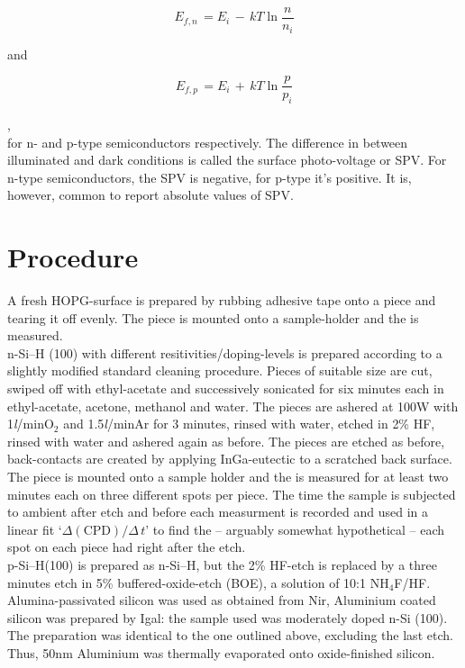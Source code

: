 \documentclass[a4paper,10pt]{article}
\newcommand{\sih}{Si--H}
\newcommand{\cpd}{\text{CPD}}
\newcommand{\hopg}{HOPG}
\newcommand{\spv}{SPV}
\newcommand{\litmin}{\emph{l}/min}
\begin{document}
\begin{minipage}[c]{0.4\textwidth}
	\begin{equation}
	E_{f,n} \, =  E_i \, - \, kT \ln{\frac{n}{n_i}}
	\end{equation}
\end{minipage}	
\hfill
and
\hfill
\begin{minipage}[c]{0.4\textwidth}
	\begin{equation}
	E_{f,p} \, = E_i \, + \, kT \ln{\frac{p}{p_i}}
	\end{equation}
\end{minipage},\\
for n- and p-type semiconductors respectively. The difference in \cpd{} between illuminated and dark conditions is called the surface photo-voltage or \spv{}. For n-type semiconductors, the \spv{} is negative, for p-type it\rq{}s positive. It is, however, common to report absolute values of \spv{}. 


\section{Procedure}
A fresh \hopg{}-surface is prepared by rubbing adhesive tape onto a piece and tearing it off evenly. The piece is mounted onto a sample-holder and the \cpd{} is measured.\\
n-\sih{} (100) with different resitivities/doping-levels is prepared according to a slightly modified standard cleaning procedure. Pieces of suitable size are cut, swiped off with ethyl-acetate and successively sonicated for six minutes each in ethyl-acetate, acetone, methanol and water. The pieces are ashered at 100W with 1\litmin O$_2$ and 1.5\litmin Ar for 3 minutes, rinsed with water, etched in 2\% HF, rinsed with water and ashered again as before. The pieces are etched as before, back-contacts are created by applying InGa-eutectic to a scratched back surface. The piece is mounted onto a sample holder and the \cpd{} is measured for at least two minutes each on three different spots per piece. The time the sample is subjected to ambient after etch and before each measurment is recorded and used in a linear fit \lq{}$\Delta (\cpd{})/\Delta \, t$\rq{} to find the -- arguably somewhat hypothetical -- \cpd{} each spot on each piece had right after the etch.\\
p-\sih{}(100) is prepared as n-\sih{}, but the 2\% HF-etch is replaced by a three minutes etch in 5\% buffered-oxide-etch (BOE), a solution of 10:1 NH$_4$F/HF.\\
Alumina-passivated silicon was used as obtained from Nir, 
Aluminium coated silicon was prepared by Igal: the sample used was moderately doped n-Si (100). The preparation was identical to the one outlined above, excluding the last etch. Thus, 50nm Aluminium was thermally evaporated onto oxide-finished silicon. 
\end{document}
